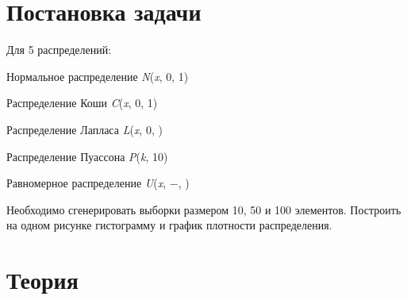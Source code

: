 \documentclass[a4paper]{article}
\begin{document}
\begin{center}
    \tableofcontents
\end{center}
\setcounter{page}{2}
\newpage

\begin{center}
    \listoffigures
\end{center}
\newpage

\section{Постановка задачи}
 Для 5 распределений:
 \begin{enumerate}
    \begin{item}
            Нормальное распределение \textit{N}(\normalsize{\textit{x}}, \normalsize{0}, \normalsize{1})
        \end{item}
        \begin{item}
            Распределение Коши \textit{C}(\normalsize{\textit{x}}, \normalsize{0}, \normalsize{1})
        \end{item}
        \begin{item}
            Распределение Лапласа \textit{L}(\normalsize{\textit{x}}, \normalsize{0}, \scriptsize{})
        \end{item} 
        \begin{item} 
            Распределение Пуассона \textit{P}(\normalsize{\textit{k}}, \normalsize{10})
        \end{item}
        \begin{item}
            Равномерное распределение \textit{U}(\normalsize{\textit{x}}, \normalsize{$-$}, \normalsize{})
        \end{item}
 \end{enumerate}
 Необходимо сгенерировать выборки размером 10, 50 и 100
 элементов.
 Построить на одном рисунке гистограмму и график плотности распределения.
 
\section{Теория}
\end{document}
